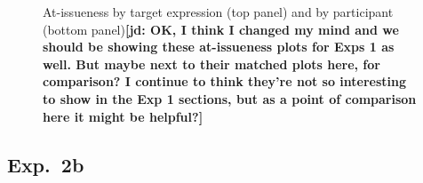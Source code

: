 \documentclass[11pt,fleqn]{article}
\newcommand{\6}{\mbox{$[\hspace*{-.6mm}[$}}
\newcommand{\9}{\mbox{$]\hspace*{-.6mm}]$}}
\newcommand{\jd}[1]{\textbf{\color{Green}[jd: #1]}}
\begin{document}
\begin{figure}[!h]
\centering


	

\caption{At-issueness by target expression (top panel) and by participant (bottom panel)\jd{OK, I think I changed my mind and we should be showing these at-issueness plots for Exps 1 as well. But maybe next to their matched plots here, for comparison? I continue to think they're not so interesting to show in the Exp 1 sections, but as a point of comparison here it might be helpful?}}
\label{fig:f-ai-2a}
\end{figure}



\subsection{Exp.~2b} 
\end{document}
